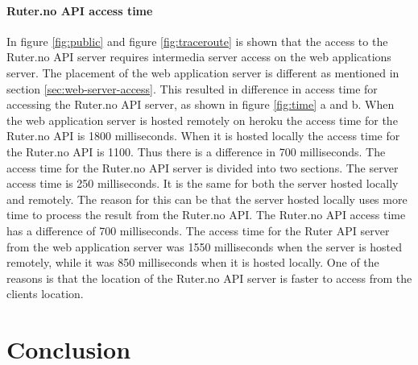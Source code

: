 \documentclass[10pt,a4paper]{article}
\begin{document}
\paragraph{Ruter.no API access time}
In figure \ref{fig:public} and figure \ref{fig:traceroute} is shown that the access to the Ruter.no API server requires intermedia server access on the web applications server. The placement of the web application server is different as mentioned in section \ref{sec:web-server-access}. This resulted in difference in access time for accessing the Ruter.no API server, as shown in figure \ref{fig:time} a and b. When the web application server is hosted remotely on heroku the access time for the Ruter.no API is 1800 milliseconds. When it is hosted locally the access time for the Ruter.no API is 1100. Thus there is a difference in 700 milliseconds. The access time for the Ruter.no API server is divided into two sections. The server access time is 250 milliseconds. It is the same for both the server hosted locally and remotely. The reason for this can be that the server hosted locally uses more time to process the result from the Ruter.no API. The Ruter.no API access time has a difference of 700 milliseconds. The access time for the Ruter API server from the web application server was 1550 milliseconds when the server is hosted remotely, while it was 850 milliseconds when it is hosted locally. One of the reasons is that the location of the Ruter.no API server is faster to access from the clients location. 



\section{Conclusion}
\end{document}
